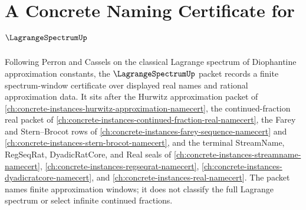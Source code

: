 \chapter{A Concrete Naming Certificate for $\LagrangeSpectrumUp$}
\label{ch:concrete-instances-lagrange-spectrum-namecert}

Following Perron and Cassels on the classical Lagrange spectrum of Diophantine approximation constants, the $\LagrangeSpectrumUp$ packet records a finite spectrum-window certificate over displayed real names and rational approximation data. It sits after the Hurwitz approximation packet of \autoref{ch:concrete-instances-hurwitz-approximation-namecert}, the continued-fraction real packet of \autoref{ch:concrete-instances-continued-fraction-real-namecert}, the Farey and Stern--Brocot rows of \autoref{ch:concrete-instances-farey-sequence-namecert} and \autoref{ch:concrete-instances-stern-brocot-namecert}, and the terminal StreamName, RegSeqRat, DyadicRatCore, and Real seals of \autoref{ch:concrete-instances-streamname-namecert}, \autoref{ch:concrete-instances-regseqrat-namecert}, \autoref{ch:concrete-instances-dyadicratcore-namecert}, and \autoref{ch:concrete-instances-real-namecert}. The packet names finite approximation windows; it does not classify the full Lagrange spectrum or select infinite continued fractions.

